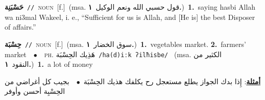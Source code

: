 \documentclass[10pt,a4paper,twoside]{article} %
\begin{document}
\begin{multicols}{2}
{\setlength\topsep{0pt}\textbf{\foreignlanguage{arabic}{حَسْبَنِة}}\ {\color{gray}\texttt{//}\color{black}}\ \textsc{noun}\ [f.]\ \color{gray}(msa. \foreignlanguage{arabic}{قول حسبي الله ونعم الوكيل}~\foreignlanguage{arabic}{\textbf{١.}})\color{black}\ \textbf{1.}~saying hasbi Allah wa ni3mal Wakeel, i. e., “Sufficient for us is Allah, and [He is] the best Disposer of affairs.”\ } \vspace{2mm}

{\setlength\topsep{0pt}\textbf{\foreignlanguage{arabic}{حِسْبَة}}\ {\color{gray}\texttt{//}\color{black}}\ \textsc{noun}\ [f.]\ \color{gray}(msa. \foreignlanguage{arabic}{سوق الخضار}~\foreignlanguage{arabic}{\textbf{١.}})\color{black}\ \textbf{1.}~vegetables market.  \textbf{2.}~farmers' market\ \ $\bullet$\ \ \textsc{ph.} \color{gray} \foreignlanguage{arabic}{هَذِيك الحِسْبَة}\color{black}\ {\color{gray}\texttt{/{\sffamily ha(d)iːk ʔilħisbe}/}\color{black}}\ \color{gray} (msa. \foreignlanguage{arabic}{الكثير من النقود}~\foreignlanguage{arabic}{\textbf{١.}})\color{black}\ \textbf{1.}~a lot of money\  \begin{flushright}\color{gray}\foreignlanguage{arabic}{\textbf{\underline{\foreignlanguage{arabic}{أمثلة}}}: إِذا بدك الجواز يطلع مستعجل رح يكلفك هذيك الحِسْبَة\ $\bullet$\ \  بجيب كل أغراضي من الحِسْبِة أحسن وأوفر}\end{flushright}\color{black}} \vspace{2mm}


\end{multicols}
\end{document}
